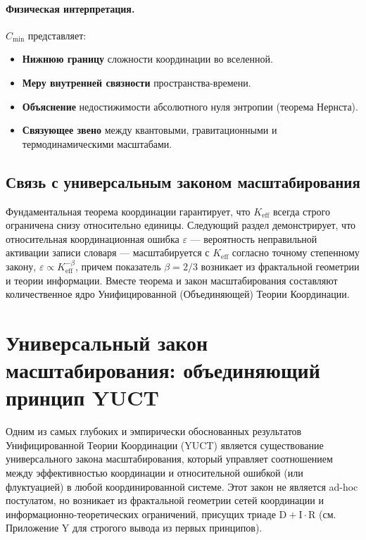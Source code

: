\documentclass[11pt,a4paper]{article}
\begin{document}
	\paragraph{Физическая интерпретация.}
	\(C_{\min}\) представляет:
	\begin{itemize}
		\item \textbf{Нижнюю границу} сложности координации во вселенной.
		\item \textbf{Меру внутренней связности} пространства-времени.
		\item \textbf{Объяснение} недостижимости абсолютного нуля энтропии
		(теорема Нернста).
		\item \textbf{Связующее звено} между квантовыми, гравитационными и термодинамическими
		масштабами.
	\end{itemize}
	
	\subsection{Связь с универсальным законом масштабирования}
	
	Фундаментальная теорема координации гарантирует, что \(K_{\mathrm{eff}}\) всегда
	строго ограничена снизу относительно единицы. Следующий раздел демонстрирует, что
	относительная координационная ошибка \(\varepsilon\) — вероятность неправильной
	активации записи словаря — масштабируется с \(K_{\mathrm{eff}}\) согласно
	точному степенному закону, \(\varepsilon \propto K_{\mathrm{eff}}^{-\beta}\), причем
	показатель \(\beta = 2/3\) возникает из фрактальной геометрии и теории
	информации. Вместе теорема и закон масштабирования составляют количественное ядро
	Унифицированной (Объединяющей) Теории Координации.
	
	\section{Универсальный закон масштабирования: объединяющий принцип YUCT}
	
	\label{sec:universal_scaling}
	
	Одним из самых глубоких и эмпирически обоснованных результатов Унифицированной Теории Координации (YUCT) является существование универсального закона масштабирования, который управляет соотношением между эффективностью координации и относительной ошибкой (или флуктуацией) в любой координированной системе. Этот закон не является ad-hoc постулатом, но возникает из фрактальной геометрии сетей координации и информационно-теоретических ограничений, присущих триаде \(\mathrm{D} + \mathrm{I}\cdot \mathrm{R}\) (см. Приложение Y для строгого вывода из первых принципов).
	
\end{document}
